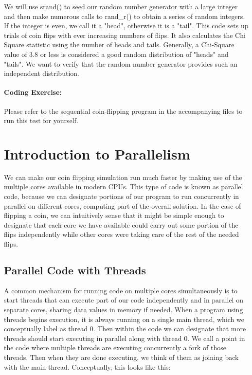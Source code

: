 \documentclass[a4paper, 11pt]{article}
\begin{document}
We will use srand() to seed our random number generator with a large integer and then make numerous calls to rand\_r() to obtain a series of random integers. If the integer is even, we call it a "head", otherwise it is a "tail". This code sets up trials of coin flips with ever increasing numbers of flips. It also calculates the Chi Square statistic using the number of heads and tails. Generally, a Chi-Square value of 3.8 or less is considered a good random distribution of "heads" and "tails". We want to verify that the random number generator provides such an independent distribution. 

\paragraph{Coding Exercise:}
Please refer to the sequential coin-flipping program in the accompanying files to run this test for yourself.

\section{Introduction to Parallelism}

We can make our coin flipping simulation run much faster by making use of the multiple cores available in modern CPUs. This type of code is known as parallel code, because we can designate portions of our program to run concurrently in parallel on different cores, computing part of the overall solution. In the case of flipping a coin, we can intuitively sense that it might be simple enough to designate that each core we have available could carry out some portion of the flips independently while other cores were taking care of the rest of the needed flips.

\subsection{Parallel Code with Threads}

A common mechanism for running code on multiple cores simultaneously is to start threads that can execute part of our code independently and in parallel on separate cores, sharing data values in memory if needed. When a program using threads begins execution, it is always running on a single main thread, which we conceptually label as thread 0. Then within the code we can designate that more threads should start executing in parallel along with thread 0. We call a point in the code where multiple threads are executing concurrently a fork of those threads. Then when they are done executing, we think of them as joining back with the main thread. Conceptually, this looks like this:
\end{document}
